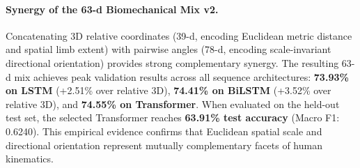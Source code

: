 \documentclass[runningheads]{llncs}
\begin{document}
\paragraph{Synergy of the 63-d Biomechanical Mix v2.} Concatenating 3D relative coordinates (39-d, encoding Euclidean metric distance and spatial limb extent) with pairwise angles (78-d, encoding scale-invariant directional orientation) provides strong complementary synergy. The resulting 63-d mix achieves peak validation results across all sequence architectures: \textbf{73.93\% on LSTM} (+2.51\% over relative 3D), \textbf{74.41\% on BiLSTM} (+3.52\% over relative 3D), and \textbf{74.55\% on Transformer}. When evaluated on the held-out test set, the selected Transformer reaches \textbf{63.91\% test accuracy} (Macro F1: 0.6240). This empirical evidence confirms that Euclidean spatial scale and directional orientation represent mutually complementary facets of human kinematics.

\begin{table}[!t]
\centering
\caption{Validation accuracy (\%) across sequence architectures for feature selection, with held-out test evaluation for the winning Transformer backbone ($\approx 400\text{K}$ parameters).}
\label{tab:table1}
\end{table}
\end{document}
